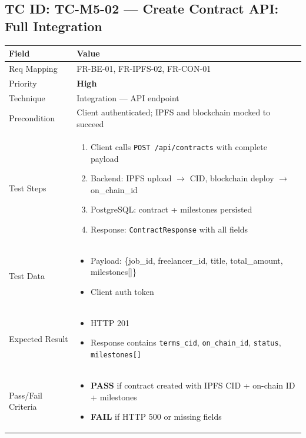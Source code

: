 \documentclass[12pt,a4paper]{article}
\newcommand{\sevhigh}{\textcolor{severityhigh}{\textbf{High}}}
\newcommand{\passresult}{\textcolor{passgreen}{\textbf{PASS}}}
\newcommand{\failresult}{\textcolor{failred}{\textbf{FAIL}}}
\begin{document}
\vspace{0.8cm}

\subsection{TC ID: TC-M5-02 --- Create Contract API: Full Integration}

\begin{tabular}{|p{}|p{}|}
\hline
\rowcolor{lightblue} \textbf{Field} & \textbf{Value} \\
\hline
Req Mapping & FR-BE-01, FR-IPFS-02, FR-CON-01 \\
\hline
Priority & \sevhigh \\
\hline
Technique & Integration --- API endpoint \\
\hline
Precondition & Client authenticated; IPFS and blockchain mocked to succeed \\
\hline
Test Steps &
\begin{enumerate}[nosep, leftmargin=*]
  \item Client calls \texttt{POST /api/contracts} with complete payload
  \item Backend: IPFS upload $\rightarrow$ CID, blockchain deploy $\rightarrow$ on\_chain\_id
  \item PostgreSQL: contract + milestones persisted
  \item Response: \texttt{ContractResponse} with all fields
\end{enumerate} \\
\hline
Test Data &
\begin{itemize}[nosep, leftmargin=*]
  \item Payload: \{job\_id, freelancer\_id, title, total\_amount, milestones[]\}
  \item Client auth token
\end{itemize} \\
\hline
Expected Result &
\begin{itemize}[nosep, leftmargin=*]
  \item HTTP 201
  \item Response contains \texttt{terms\_cid}, \texttt{on\_chain\_id}, \texttt{status}, \texttt{milestones[]}
\end{itemize} \\
\hline
Pass/Fail Criteria &
\begin{itemize}[nosep, leftmargin=*]
  \item \passresult{} if contract created with IPFS CID + on-chain ID + milestones
  \item \failresult{} if HTTP 500 or missing fields
\end{itemize} \\
\hline
\end{tabular}
\end{document}

